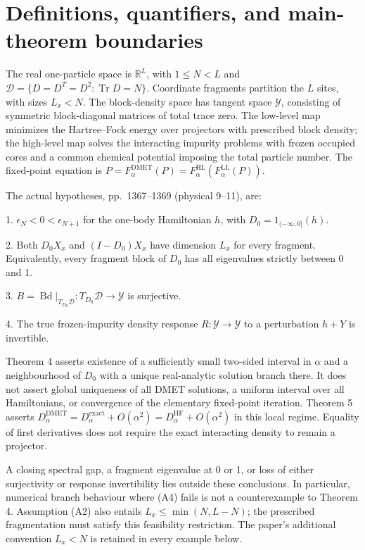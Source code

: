 \documentclass[10pt]{article}
\begin{document}
\section*{Definitions, quantifiers, and main-theorem boundaries}
The real one-particle space is \(\mathbb R^L\), with \(1\leq N<L\) and \(\mathcal D=\{D=D^T=D^2:\operatorname{Tr}D=N\}\). Coordinate fragments partition the \(L\) sites, with sizes \(L_x<N\). The block-density space has tangent space \(\mathcal Y\), consisting of symmetric block-diagonal matrices of total trace zero. The low-level map minimizes the Hartree–Fock energy over projectors with prescribed block density; the high-level map solves the interacting impurity problems with frozen occupied cores and a common chemical potential imposing the total particle number. The fixed-point equation is \(P=F^\mathrm{DMET}_\alpha(P)=F^\mathrm{HL}_\alpha(F^\mathrm{LL}_\alpha(P))\).\par
The actual hypotheses, pp. 1367–1369 (physical 9–11), are:\par
1. \(\epsilon_N<0<\epsilon_{N+1}\) for the one-body Hamiltonian \(h\), with \(D_0=1_{(-\infty,0]}(h)\).\par
2. Both \(D_0X_x\) and \((I-D_0)X_x\) have dimension \(L_x\) for every fragment. Equivalently, every fragment block of \(D_0\) has all eigenvalues strictly between 0 and 1.\par
3. \(B=\operatorname{Bd}|_{T_{D_0}\mathcal D}:T_{D_0}\mathcal D\to\mathcal Y\) is surjective.\par
4. The true frozen-impurity density response \(R:\mathcal Y\to\mathcal Y\) to a perturbation \(h+Y\) is invertible.\par
Theorem 4 asserts existence of a sufficiently small two-sided interval in \(\alpha\) and a neighbourhood of \(D_0\) with a unique real-analytic solution branch there. It does not assert global uniqueness of all DMET solutions, a uniform interval over all Hamiltonians, or convergence of the elementary fixed-point iteration. Theorem 5 asserts \(D^\mathrm{DMET}_\alpha=D^\mathrm{exact}_\alpha+O(\alpha^2)
=D^\mathrm{HF}_\alpha+O(\alpha^2)\) in this local regime. Equality of first derivatives does not require the exact interacting density to remain a projector.\par
A closing spectral gap, a fragment eigenvalue at 0 or 1, or loss of either surjectivity or response invertibility lies outside these conclusions. In particular, numerical branch behaviour where (A4) fails is not a counterexample to Theorem 4. Assumption (A2) also entails \(L_x\leq \min(N,L-N)\); the prescribed fragmentation must satisfy this feasibility restriction. The paper’s additional convention \(L_x<N\) is retained in every example below.\par
\end{document}
